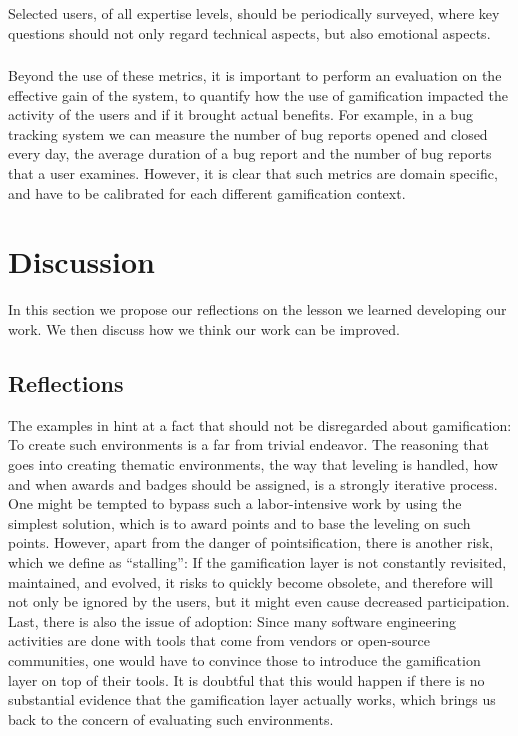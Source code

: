 Selected users, of all expertise levels, should be periodically surveyed, where key questions should not only regard technical aspects, but also emotional aspects.


\subsubsection{}

Beyond the use of these metrics, it is important to perform an evaluation on the effective gain of the system, to quantify how the use of gamification impacted the activity of the users and if it brought actual benefits.
For example, in a bug tracking system we can measure the number of bug reports opened and closed every day, the average duration of a bug report and the number of bug reports that a user examines.
However, it is clear that such metrics are domain specific, and have to be calibrated for each different gamification context.


\section{Discussion}\label{sec:gamification-discussion}

In this section we propose our reflections on the lesson we learned developing our work.
We then discuss how we think our work can be improved.


\subsection{Reflections}

The examples in  hint at a fact that should not be disregarded about gamification: To create such environments is a far from trivial endeavor.
The reasoning that goes into creating thematic environments, the way that leveling is handled, how and when awards and badges should be assigned, is a strongly iterative process.
One might be tempted to bypass such a labor-intensive work by using the simplest solution, which is to award points and to base the leveling on such points.
However, apart from the danger of pointsification, there is another risk, which we define as ``stalling'': If the gamification layer is not constantly revisited, maintained, and evolved, it risks to quickly become obsolete, and therefore will not only be ignored by the users, but it might even cause decreased participation.
Last, there is also the issue of adoption: Since many software engineering activities are done with tools that come from vendors or open-source communities, one would have to convince those to introduce the gamification layer on top of their tools.
It is doubtful that this would happen if there is no substantial evidence that the gamification layer actually works, which brings us back to the concern of evaluating such environments.

